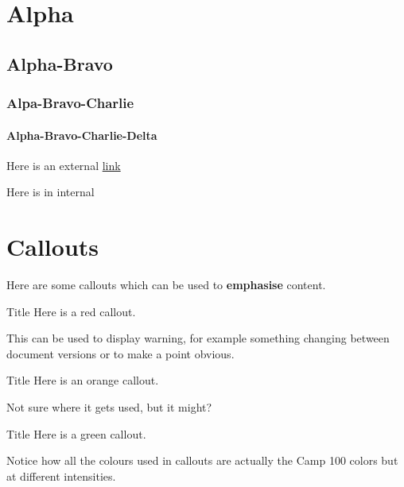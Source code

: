 \documentclass[a4paper, 11pt]{report}
\begin{document}
\makedocumenttitlepage

\tableofcontents

\chapter{Alpha}
\lipsum[1]
\section{Alpha-Bravo}
\subsection{Alpa-Bravo-Charlie}
\subsubsection{Alpha-Bravo-Charlie-Delta}
\lipsum[1-3]

Here is an external \href{https://camp100.org.uk}{link}

Here is in internal 

\chapter{Callouts}
Here are some callouts which can be used to \textbf{emphasise} content.

\begin{callout-red}{Title}
Here is a red callout.

This can be used to display warning, for example something changing between document versions or to make a point obvious.
\end{callout-red}

\begin{callout-orange}{Title}
Here is an orange callout.

Not sure where it gets used, but it might?
\end{callout-orange}

\begin{callout-green}{Title}
Here is a green callout.

Notice how all the colours used in callouts are actually the Camp 100 colors but at different intensities. 
\end{callout-green}
\end{document}
